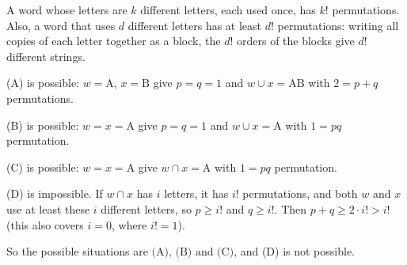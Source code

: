 A word whose letters are $k$ different letters, each used once, has $k!$ permutations. Also, a word that uses $d$ different letters has at least $d!$ permutations: writing all copies of each letter together as a block, the $d!$ orders of the blocks give $d!$ different strings.

(A) is possible: $w=\text{A}$, $x=\text{B}$ give $p=q=1$ and $w\cup x=\text{AB}$ with $2=p+q$ permutations.

(B) is possible: $w=x=\text{A}$ give $p=q=1$ and $w\cup x=\text{A}$ with $1=pq$ permutation.

(C) is possible: $w=x=\text{A}$ give $w\cap x=\text{A}$ with $1=pq$ permutation.

(D) is impossible. If $w\cap x$ has $i$ letters, it has $i!$ permutations, and both $w$ and $x$ use at least these $i$ different letters, so $p\ge i!$ and $q\ge i!$. Then $p+q\ge2\cdot i!>i!$ (this also covers $i=0$, where $i!=1$).

So the possible situations are $\boxed{\text{(A), (B) and (C)}}$, and (D) is not possible.
